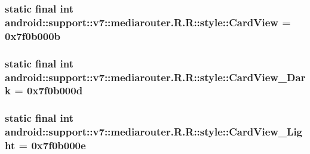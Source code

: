 \hypertarget{classandroid_1_1support_1_1v7_1_1mediarouter_1_1_r_1_1style_8511f30cf4ba1705c91e811246a85441}{
\subsubsection[{CardView}]{\setlength{\rightskip}{0pt plus 5cm}static final int android::support::v7::mediarouter.R.R::style::CardView = 0x7f0b000b}}
\label{classandroid_1_1support_1_1v7_1_1mediarouter_1_1_r_1_1style_8511f30cf4ba1705c91e811246a85441}


\hypertarget{classandroid_1_1support_1_1v7_1_1mediarouter_1_1_r_1_1style_1b5665a9d63f866493a953216965a2f6}{
\subsubsection[{CardView\_\-Dark}]{\setlength{\rightskip}{0pt plus 5cm}static final int android::support::v7::mediarouter.R.R::style::CardView\_\-Dark = 0x7f0b000d}}
\label{classandroid_1_1support_1_1v7_1_1mediarouter_1_1_r_1_1style_1b5665a9d63f866493a953216965a2f6}


\hypertarget{classandroid_1_1support_1_1v7_1_1mediarouter_1_1_r_1_1style_07e180e327dbe6c52703664769e2a68b}{
\subsubsection[{CardView\_\-Light}]{\setlength{\rightskip}{0pt plus 5cm}static final int android::support::v7::mediarouter.R.R::style::CardView\_\-Light = 0x7f0b000e}}
\label{classandroid_1_1support_1_1v7_1_1mediarouter_1_1_r_1_1style_07e180e327dbe6c52703664769e2a68b}


